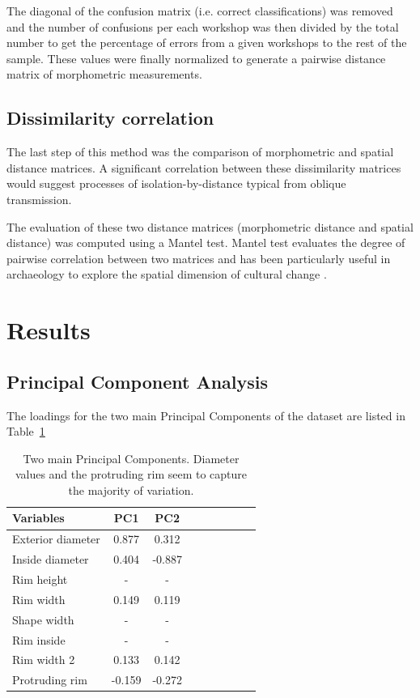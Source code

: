 \documentclass[review]{elsarticle}
\begin{document}
The diagonal of the confusion matrix (i.e. correct classifications) was removed and the number of confusions per each workshop was then divided by the total number to get the percentage of errors from a given workshops to the rest of the sample. These values were finally normalized to generate a pairwise distance matrix of morphometric measurements.

\subsection{Dissimilarity correlation}

The last step of this method was the comparison of morphometric and spatial distance matrices. A significant correlation between these dissimilarity matrices would suggest processes of isolation-by-distance typical from oblique transmission.

The evaluation of these two distance matrices (morphometric distance and spatial distance) was computed using a Mantel test. Mantel test evaluates the degree of pairwise correlation between two matrices and has been particularly useful in archaeology to explore the spatial dimension of cultural change \citep{mantel_detection_1967, diniz-filho_mantel_2013, crema_culture_2014}.  

\section{Results}

\subsection{Principal Component Analysis}

The loadings for the two main Principal Components of the dataset are listed in Table~\ref{table:pca}

\begin{table}[htp]
\centering
\begin{tabular}{lcccccccc}
\hline
Variables & PC1 & PC2 \\ \hline
Exterior diameter & 0.877 & 0.312 \\
Inside diameter & 0.404 & -0.887 \\
Rim height & - & - \\
Rim width & 0.149 & 0.119 \\
Shape width & - & - \\
Rim inside & - & - \\
Rim width 2 & 0.133 & 0.142 \\
Protruding rim & -0.159 & -0.272 \\
\hline
\end{tabular}
\caption{Two main Principal Components. Diameter values and the protruding rim seem to capture the majority of variation.}
\label{table:pca}
\end{table}
\end{document}
